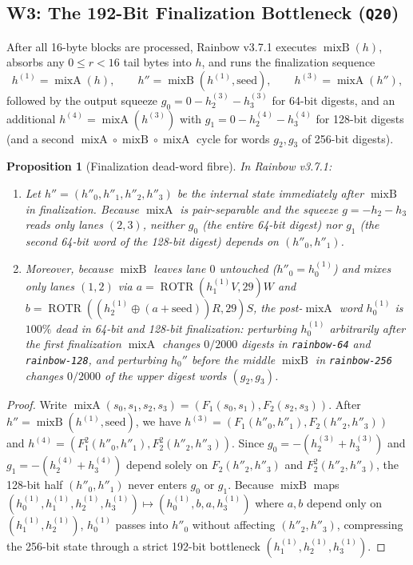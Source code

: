 \documentclass[10pt]{article}
\newtheorem{proposition}{Proposition}
\theoremstyle{definition}
\newcommand{\ROTR}{\operatorname{ROTR}}
\newcommand{\mixA}{\operatorname{mixA}}
\newcommand{\mixB}{\operatorname{mixB}}
\newcommand{\code}[1]{\texttt{#1}}
\begin{document}
\subsection{W3: The 192-Bit Finalization Bottleneck (\code{Q20})}
\label{sec:bottleneck}

After all 16-byte blocks are processed, Rainbow v3.7.1 executes $\mixB(h)$, absorbs any $0 \le r < 16$ tail bytes into $h$, and runs the finalization sequence
\[
  h^{(1)} = \mixA(h), \qquad h'' = \mixB(h^{(1)}, \text{seed}), \qquad h^{(3)} = \mixA(h''),
\]
followed by the output squeeze $g_0 = 0 - h^{(3)}_2 - h^{(3)}_3$ for 64-bit digests, and an additional $h^{(4)} = \mixA(h^{(3)})$ with $g_1 = 0 - h^{(4)}_2 - h^{(4)}_3$ for 128-bit digests (and a second $\mixA \circ \mixB \circ \mixA$ cycle for words $g_2, g_3$ of 256-bit digests).

\begin{proposition}[Finalization dead-word fibre]
\label{prop:deadword}
In Rainbow v3.7.1:
\begin{enumerate}
  \item Let $h'' = (h''_0, h''_1, h''_2, h''_3)$ be the internal state immediately after $\mixB$ in finalization. Because $\mixA$ is pair-separable and the squeeze $g = -h_2 - h_3$ reads only lanes $(2,3)$, neither $g_0$ (the entire 64-bit digest) nor $g_1$ (the second 64-bit word of the 128-bit digest) depends on $(h''_0, h''_1)$.
  \item Moreover, because $\mixB$ leaves lane $0$ untouched ($h''_0 = h^{(1)}_0$) and mixes only lanes $(1,2)$ via $a = \ROTR(h^{(1)}_1 V, 29)W$ and $b = \ROTR((h^{(1)}_2 \oplus (a + \text{seed}))R, 29)S$, the post-$\mixA$ word $h^{(1)}_0$ is $100\%$ dead in 64-bit and 128-bit finalization: perturbing $h^{(1)}_0$ arbitrarily after the first finalization $\mixA$ changes $0/2000$ digests in \code{rainbow-64} and \code{rainbow-128}, and perturbing $h_0''$ before the middle $\mixB$ in \code{rainbow-256} changes $0/2000$ of the upper digest words $(g_2, g_3)$.
\end{enumerate}
\end{proposition}

\begin{proof}
Write $\mixA(s_0, s_1, s_2, s_3) = (F_1(s_0, s_1), F_2(s_2, s_3))$. After $h'' = \mixB(h^{(1)}, \text{seed})$, we have $h^{(3)} = (F_1(h''_0, h''_1), F_2(h''_2, h''_3))$ and $h^{(4)} = (F_1^2(h''_0, h''_1), F_2^2(h''_2, h''_3))$. Since $g_0 = -(h^{(3)}_2 + h^{(3)}_3)$ and $g_1 = -(h^{(4)}_2 + h^{(4)}_3)$ depend solely on $F_2(h''_2, h''_3)$ and $F_2^2(h''_2, h''_3)$, the 128-bit half $(h''_0, h''_1)$ never enters $g_0$ or $g_1$. Because $\mixB$ maps $(h^{(1)}_0, h^{(1)}_1, h^{(1)}_2, h^{(1)}_3) \mapsto (h^{(1)}_0, b, a, h^{(1)}_3)$ where $a,b$ depend only on $(h^{(1)}_1, h^{(1)}_2)$, $h^{(1)}_0$ passes into $h''_0$ without affecting $(h''_2, h''_3)$, compressing the 256-bit state through a strict 192-bit bottleneck $(h^{(1)}_1, h^{(1)}_2, h^{(1)}_3)$.
\end{proof}
\end{document}
